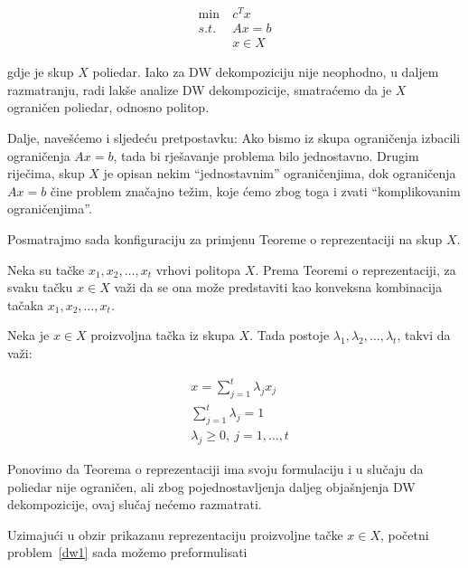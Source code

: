 \documentclass[a4paper, utf8, 11pt, colorlinks]{book}
\begin{document}
  \begin{equation}
 	\begin{aligned}\label{dw1}
 		\min\  &c^Tx\\
 		s.t.\  &Ax=b\\
 		&x \in X
 	\end{aligned}
 \end{equation}
 
 gdje je skup $X$ poliedar. Iako za DW dekompoziciju nije neophodno, u daljem razmatranju, radi lakše analize DW dekompozicije, smatraćemo da je $X$ ograničen poliedar, odnosno politop.
 
 Dalje, navešćemo i sljedeću pretpostavku: Ako bismo iz skupa ograničenja izbacili ograničenja $Ax=b$, tada bi rješavanje problema bilo jednostavno. Drugim riječima, skup $X$ je opisan nekim ``jednostavnim'' ograničenjima, dok ograničenja $Ax=b$ čine problem značajno težim, koje ćemo zbog toga i zvati ``komplikovanim ograničenjima''. 
 
 Posmatrajmo sada konfiguraciju za primjenu Teoreme o reprezentaciji na skup $X$.
 
 Neka su tačke $x_1,x_2,\dots,x_t$ vrhovi politopa $X$.  
 Prema Teoremi o reprezentaciji, za svaku tačku $x\in X$ važi da se ona može predstaviti kao konveksna kombinacija tačaka $x_1,x_2,\dots,x_t$.
 
 Neka je  $x \in X$ proizvoljna tačka iz skupa $X$.  Tada postoje $\lambda_1,\lambda_2,\ldots,\lambda_t$, takvi da važi:
 
 \begin{equation}
 	\begin{aligned}
 		&x = \sum_{j=1}^t\lambda_jx_j\\
 		 &\sum_{j=1}^t\lambda_j = 1\\
 		&\lambda_j\geqslant 0,\ j = 1,\ldots,t
 	\end{aligned}
 \end{equation}
 
 Ponovimo da Teorema o reprezentaciji ima svoju formulaciju i u slučaju da poliedar nije ograničen, ali zbog pojednostavljenja daljeg objašnjenja DW dekompozicije, ovaj slučaj nećemo razmatrati.
 
 Uzimajući u obzir prikazanu reprezentaciju proizvoljne tačke $x\in X$, početni problem~\ref{dw1} sada možemo preformulisati 
 
\end{document}
